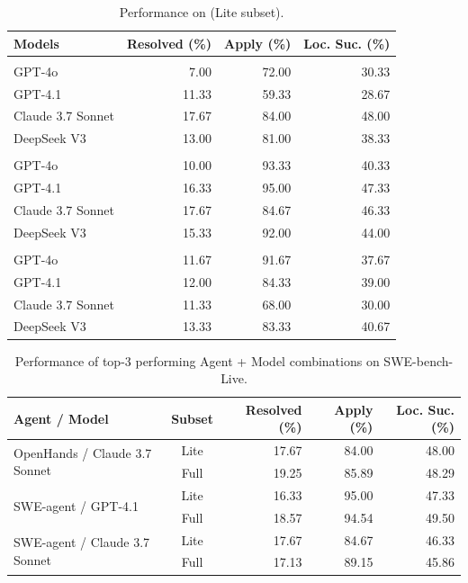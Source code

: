\begin{table}%
\centering
\caption{Performance on \benchmark (Lite subset).}
\label{tab:perf_lite}
\begin{tabular}{l|rrr}
\toprule
\textbf{Models} & \textbf{Resolved (\%)} & \textbf{Apply (\%)} & \textbf{Loc. Suc. (\%)} \\
\midrule
\rowcolor{gray!20}
\multicolumn{4}{c}{\textbf{OpenHands}} \\
GPT-4o & 7.00 & 72.00 & 30.33 \\
GPT-4.1 & 11.33 & 59.33 & 28.67 \\
Claude 3.7 Sonnet & 17.67 & 84.00 & 48.00 \\
DeepSeek V3 & 13.00 & 81.00 & 38.33 \\
\midrule
\rowcolor{gray!20}
\multicolumn{4}{c}{\textbf{SWE-agent}} \\
GPT-4o & 10.00 & 93.33 & 40.33 \\
GPT-4.1 & 16.33 & 95.00 & 47.33 \\
Claude 3.7 Sonnet & 17.67 & 84.67 & 46.33 \\
DeepSeek V3 & 15.33 & 92.00 & 44.00 \\
\midrule
\rowcolor{gray!20}
\multicolumn{4}{c}{\textbf{Agentless}} \\
GPT-4o & 11.67 & 91.67 & 37.67 \\
GPT-4.1 & 12.00 & 84.33 & 39.00 \\
Claude 3.7 Sonnet & 11.33 & 68.00 & 30.00 \\
DeepSeek V3 & 13.33 & 83.33 & 40.67 \\
\bottomrule

\end{tabular}
\end{table}



\begin{table}[t]
    \centering
    \caption{Performance of top-3 performing Agent + Model combinations on SWE-bench-Live.}
    \begin{tabular}{l|c|rrr}
    \toprule
    \textbf{Agent / Model} & \textbf{Subset} & \textbf{Resolved (\%)} & \textbf{Apply (\%)} & \textbf{Loc. Suc. (\%)} \\
    \midrule
    \multirow{2}{*}{OpenHands / Claude 3.7 Sonnet} & Lite 
    & 17.67 & 84.00 & 48.00 \\ 
  & Full & 19.25 & 85.89 & 48.29 \\
\midrule
\multirow{2}{*}{SWE-agent / GPT-4.1} & Lite
    & 16.33 & 95.00 & 47.33 \\
  & Full  & 18.57 & 94.54 & 49.50 \\
\midrule
\multirow{2}{*}{SWE-agent / Claude 3.7 Sonnet} & Lite
    & 17.67 & 84.67 & 46.33 \\
  & Full & 17.13 & 89.15 & 45.86 \\
    \bottomrule
    \end{tabular}
    
    \vspace{-1em}
    \label{tab:full}
\end{table}


